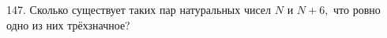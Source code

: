 147. Сколько существует таких пар натуральных чисел $N$ и $N+6,$ что ровно одно из них трёхзначное?\\
